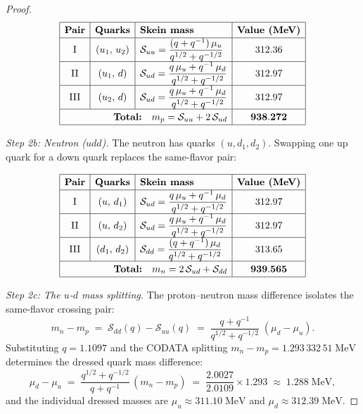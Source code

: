\begin{proof}
$$
\renewcommand{\arraystretch}{1.3}
\begin{array}{|c|c|l|c|}
\hline
\textbf{Pair} & \textbf{Quarks} & \textbf{Skein mass}
  & \textbf{Value (MeV)} \\ \hline
\text{I}   & (u_1,\, u_2) &
  \displaystyle \mathcal{S}_{uu}
  = \frac{(q + q^{-1})\,\mu_u}{q^{1/2}+q^{-1/2}}
  & 312.36 \\ \hline
\text{II}  & (u_1,\, d)   &
  \displaystyle \mathcal{S}_{ud}
  = \frac{q\,\mu_u + q^{-1}\,\mu_d}{q^{1/2}+q^{-1/2}}
  & 312.97 \\ \hline
\text{III} & (u_2,\, d)   &
  \displaystyle \mathcal{S}_{ud}
  = \frac{q\,\mu_u + q^{-1}\,\mu_d}{q^{1/2}+q^{-1/2}}
  & 312.97 \\ \hline
\multicolumn{3}{|r|}{\textbf{Total:}\quad
  m_p = \mathcal{S}_{uu} + 2\,\mathcal{S}_{ud}}
  & \mathbf{938.272} \\ \hline
\end{array}
$$

\emph{Step 2b: Neutron ($udd$).}
The neutron has quarks $(u, d_1, d_2)$. Swapping one up quark for a down
quark replaces the same-flavor pair:

$$
\renewcommand{\arraystretch}{1.3}
\begin{array}{|c|c|l|c|}
\hline
\textbf{Pair} & \textbf{Quarks} & \textbf{Skein mass}
  & \textbf{Value (MeV)} \\ \hline
\text{I}   & (u,\, d_1) &
  \displaystyle \mathcal{S}_{ud}
  = \frac{q\,\mu_u + q^{-1}\,\mu_d}{q^{1/2}+q^{-1/2}}
  & 312.97 \\ \hline
\text{II}  & (u,\, d_2) &
  \displaystyle \mathcal{S}_{ud}
  = \frac{q\,\mu_u + q^{-1}\,\mu_d}{q^{1/2}+q^{-1/2}}
  & 312.97 \\ \hline
\text{III} & (d_1,\, d_2) &
  \displaystyle \mathcal{S}_{dd}
  = \frac{(q + q^{-1})\,\mu_d}{q^{1/2}+q^{-1/2}}
  & 313.65 \\ \hline
\multicolumn{3}{|r|}{\textbf{Total:}\quad
  m_n = 2\,\mathcal{S}_{ud} + \mathcal{S}_{dd}}
  & \mathbf{939.565} \\ \hline
\end{array}
$$

\emph{Step 2c: The $u$-$d$ mass splitting.}
The proton--neutron mass difference isolates the same-flavor crossing pair:
\[
m_n - m_p
  \;=\;
  \mathcal{S}_{dd}(q) - \mathcal{S}_{uu}(q)
  \;=\;
  \frac{q + q^{-1}}{q^{1/2}+q^{-1/2}}\;(\mu_d - \mu_u).
\]
Substituting $q = 1.1097$ and the CODATA splitting
$m_n - m_p = 1.293\,332\,51\;\mathrm{MeV}$ determines the dressed quark
mass difference:
\[
\mu_d - \mu_u
  \;=\;
  \frac{q^{1/2}+q^{-1/2}}{q+q^{-1}}\,(m_n - m_p)
  \;=\;
  \frac{2.0027}{2.0109} \times 1.293
  \;\approx\; 1.288\;\mathrm{MeV},
\]
and the individual dressed masses are
$\mu_u \approx 311.10\;\mathrm{MeV}$ and
$\mu_d \approx 312.39\;\mathrm{MeV}$.


\end{proof}

